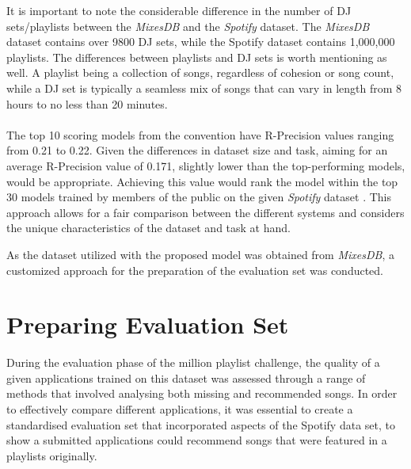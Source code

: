 It is important to note the considerable difference in the number of DJ sets/playlists between the \textit{MixesDB} and the \textit{Spotify} dataset. The \textit{MixesDB} dataset contains over 9800 DJ sets, while the Spotify dataset contains 1,000,000 playlists. The differences between playlists and DJ sets is worth mentioning as well. A playlist being a collection of songs, regardless of cohesion or song count, while a DJ set is typically a seamless mix of songs that can vary in length from 8 hours to no less than 20 minutes.
\\
\\
The top 10 scoring models from the convention have R-Precision values ranging from 0.21 to 0.22. Given the differences in dataset size and task, aiming for an average R-Precision value of 0.171, slightly lower than the top-performing models, would be appropriate. Achieving this value would rank the model within the top 30 models trained by members of the public on the given \textit{Spotify} dataset \citep{aicrowd_aicrowd_2023}. This approach allows for a fair comparison between the different systems and considers the unique characteristics of the dataset and task at hand. 

As the dataset utilized with the proposed model was obtained from \textit{MixesDB}, a customized approach for the preparation of the evaluation set was conducted.

\section{Preparing Evaluation Set}
During the evaluation phase of the million playlist challenge, the quality of a given applications trained on this dataset was assessed through a range of methods that involved analysing both missing and recommended songs. In order to effectively compare different applications, it was essential to create a standardised evaluation set that incorporated aspects of the Spotify data set, to show a submitted applications could recommend songs that were featured in a playlists originally.

